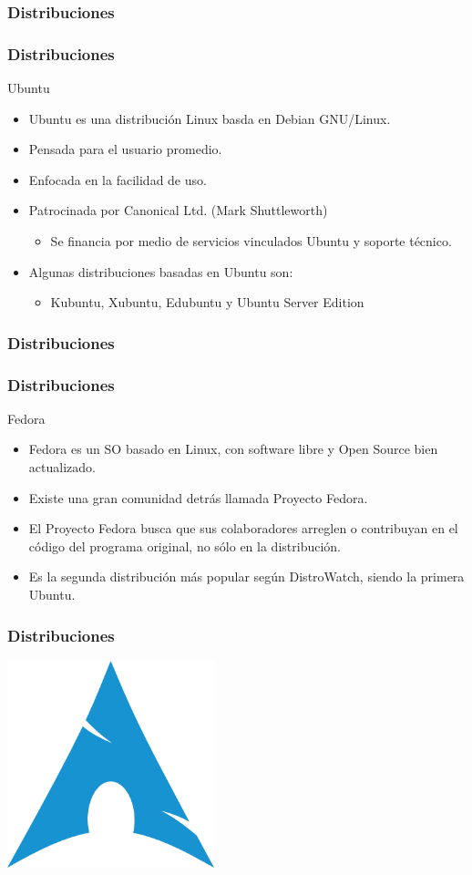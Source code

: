 \frame
{
\frametitle{Distribuciones}
\vspace{1cm}
\begin{center}
\end{center}
}


\frame
{
\frametitle{Distribuciones}
\Large{Ubuntu}
\normalsize
\begin{itemize}
	\item Ubuntu es una distribución Linux basda en Debian GNU/Linux.
	\item Pensada para el usuario promedio.
	\item Enfocada en la facilidad de uso.
	\item Patrocinada por Canonical Ltd. (Mark Shuttleworth)
	 \begin{itemize}
	 	\item Se financia por medio de servicios vinculados Ubuntu y soporte técnico.
	 \end{itemize}
	\item Algunas distribuciones basadas en Ubuntu son:
	\begin{itemize}
		\item Kubuntu, Xubuntu, Edubuntu y Ubuntu Server Edition
	\end{itemize}
\end{itemize}
}

\frame
{
\frametitle{Distribuciones}
\begin{center}
\end{center}
}

\frame
{
\frametitle{Distribuciones}
\Large{Fedora}
\normalsize
\begin{itemize}
	\item Fedora es un SO basado en Linux, con software libre y Open Source bien actualizado.
	\item Existe una gran comunidad detrás llamada Proyecto Fedora.
	\item El Proyecto Fedora busca que sus colaboradores arreglen o contribuyan en el código del programa original, no sólo en la distribución.
	\item Es la segunda distribución más popular según DistroWatch, siendo la primera Ubuntu. 
\end{itemize}
}

\frame
{
\frametitle{Distribuciones}
\vspace{1cm}
\begin{center}
	\includegraphics[width=6cm]{img/arch}
\end{center}
}


